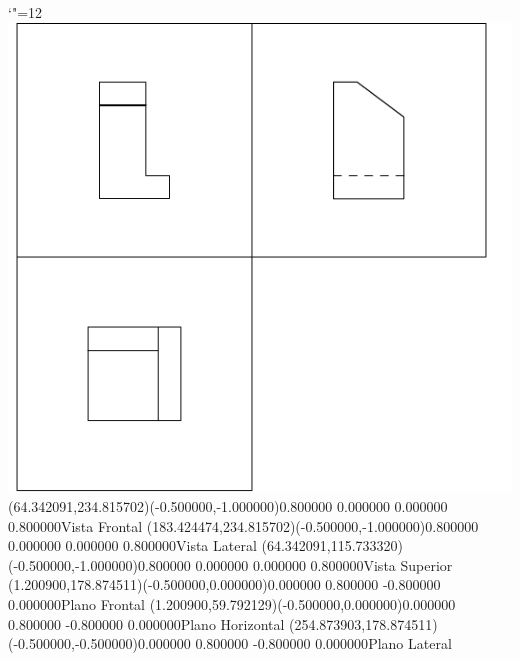 \documentclass[12pt]{article}
\begin{document}
\makeatletter%
\let\ASYencoding\f@encoding%
\let\ASYfamily\f@family%
\let\ASYseries\f@series%
\let\ASYshape\f@shape%
\makeatother%
{\catcode`"=12%
\includegraphics{aluno-41_0}%
}%
\kern -256.074803pt%
\color{ASYcolor}%
\fontsize{12.000000}{14.400000}\selectfont%
\usefont{\ASYencoding}{\ASYfamily}{\ASYseries}{\ASYshape}%
\ASYalignT(64.342091,234.815702)(-0.500000,-1.000000){0.800000 0.000000 0.000000 0.800000}{Vista Frontal}%
\color{ASYcolor}%
\fontsize{12.000000}{14.400000}\selectfont%
\ASYalignT(183.424474,234.815702)(-0.500000,-1.000000){0.800000 0.000000 0.000000 0.800000}{Vista Lateral}%
\color{ASYcolor}%
\fontsize{12.000000}{14.400000}\selectfont%
\ASYalignT(64.342091,115.733320)(-0.500000,-1.000000){0.800000 0.000000 0.000000 0.800000}{Vista Superior}%
\color{ASYcolor}%
\fontsize{12.000000}{14.400000}\selectfont%
\ASYalignT(1.200900,178.874511)(-0.500000,0.000000){0.000000 0.800000 -0.800000 0.000000}{Plano Frontal}%
\color{ASYcolor}%
\fontsize{12.000000}{14.400000}\selectfont%
\ASYalignT(1.200900,59.792129)(-0.500000,0.000000){0.000000 0.800000 -0.800000 0.000000}{Plano Horizontal}%
\color{ASYcolor}%
\fontsize{12.000000}{14.400000}\selectfont%
\ASYalignT(254.873903,178.874511)(-0.500000,-0.500000){0.000000 0.800000 -0.800000 0.000000}{Plano Lateral}%
\end{document}
